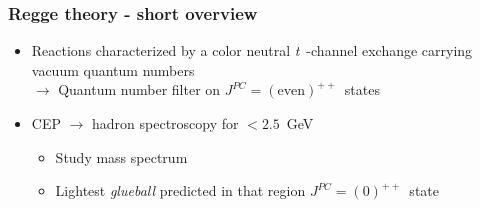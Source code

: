 \documentclass{beamer}
\begin{document}
\begin{frame}
\begin{tikzpicture}
    \end{tikzpicture}
        
\end{frame}


\begin{frame}
    \frametitle{Regge theory - short overview}
    \begin{itemize}
        \item<1-> Reactions characterized by a color neutral \emph{t}~-channel exchange carrying vacuum quantum numbers\\$\to$ Quantum number filter on $J^{PC} = (\text{even})^{++}$~states
        \item<2-> CEP $\to$ hadron spectroscopy for $<2.5$~GeV
        \begin{itemize}
            \item<2-> Study mass spectrum
            \item<3-> Lightest \emph{glueball} predicted in that region $J^{PC} = (0)^{++}$~state
        \end{itemize}
    \end{itemize}
    \centering{}
 
\end{frame}
\end{document}
